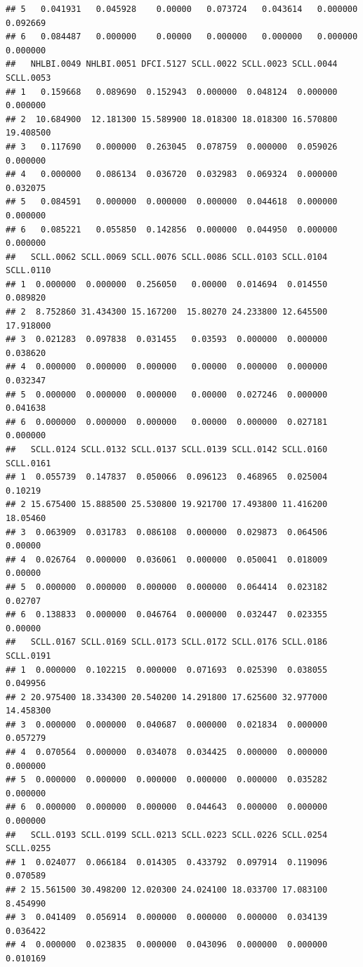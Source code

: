 \documentclass[
]{article}
\begin{document}
\begin{verbatim}
## 5   0.041931   0.045928    0.00000   0.073724   0.043614   0.000000   0.092669
## 6   0.084487   0.000000    0.00000   0.000000   0.000000   0.000000   0.000000
##   NHLBI.0049 NHLBI.0051 DFCI.5127 SCLL.0022 SCLL.0023 SCLL.0044 SCLL.0053
## 1   0.159668   0.089690  0.152943  0.000000  0.048124  0.000000  0.000000
## 2  10.684900  12.181300 15.589900 18.018300 18.018300 16.570800 19.408500
## 3   0.117690   0.000000  0.263045  0.078759  0.000000  0.059026  0.000000
## 4   0.000000   0.086134  0.036720  0.032983  0.069324  0.000000  0.032075
## 5   0.084591   0.000000  0.000000  0.000000  0.044618  0.000000  0.000000
## 6   0.085221   0.055850  0.142856  0.000000  0.044950  0.000000  0.000000
##   SCLL.0062 SCLL.0069 SCLL.0076 SCLL.0086 SCLL.0103 SCLL.0104 SCLL.0110
## 1  0.000000  0.000000  0.256050   0.00000  0.014694  0.014550  0.089820
## 2  8.752860 31.434300 15.167200  15.80270 24.233800 12.645500 17.918000
## 3  0.021283  0.097838  0.031455   0.03593  0.000000  0.000000  0.038620
## 4  0.000000  0.000000  0.000000   0.00000  0.000000  0.000000  0.032347
## 5  0.000000  0.000000  0.000000   0.00000  0.027246  0.000000  0.041638
## 6  0.000000  0.000000  0.000000   0.00000  0.000000  0.027181  0.000000
##   SCLL.0124 SCLL.0132 SCLL.0137 SCLL.0139 SCLL.0142 SCLL.0160 SCLL.0161
## 1  0.055739  0.147837  0.050066  0.096123  0.468965  0.025004   0.10219
## 2 15.675400 15.888500 25.530800 19.921700 17.493800 11.416200  18.05460
## 3  0.063909  0.031783  0.086108  0.000000  0.029873  0.064506   0.00000
## 4  0.026764  0.000000  0.036061  0.000000  0.050041  0.018009   0.00000
## 5  0.000000  0.000000  0.000000  0.000000  0.064414  0.023182   0.02707
## 6  0.138833  0.000000  0.046764  0.000000  0.032447  0.023355   0.00000
##   SCLL.0167 SCLL.0169 SCLL.0173 SCLL.0172 SCLL.0176 SCLL.0186 SCLL.0191
## 1  0.000000  0.102215  0.000000  0.071693  0.025390  0.038055  0.049956
## 2 20.975400 18.334300 20.540200 14.291800 17.625600 32.977000 14.458300
## 3  0.000000  0.000000  0.040687  0.000000  0.021834  0.000000  0.057279
## 4  0.070564  0.000000  0.034078  0.034425  0.000000  0.000000  0.000000
## 5  0.000000  0.000000  0.000000  0.000000  0.000000  0.035282  0.000000
## 6  0.000000  0.000000  0.000000  0.044643  0.000000  0.000000  0.000000
##   SCLL.0193 SCLL.0199 SCLL.0213 SCLL.0223 SCLL.0226 SCLL.0254 SCLL.0255
## 1  0.024077  0.066184  0.014305  0.433792  0.097914  0.119096  0.070589
## 2 15.561500 30.498200 12.020300 24.024100 18.033700 17.083100  8.454990
## 3  0.041409  0.056914  0.000000  0.000000  0.000000  0.034139  0.036422
## 4  0.000000  0.023835  0.000000  0.043096  0.000000  0.000000  0.010169

\end{verbatim}
\end{document}
